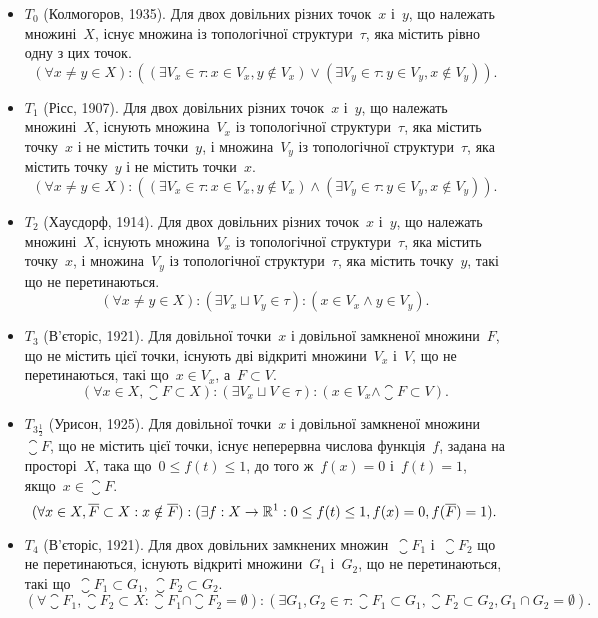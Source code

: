 \begin{itemize}
    \item $T_0$ (Колмогоров, 1935). Для двох довільних різних точок~$x$ і~$y$, що належать множині~$X$, існує множина із топологічної структури~$\tau$, яка містить рівно одну з цих точок.
    \[ (\forall x \ne y \in X): ((\exists V_x \in \tau: x \in V_x, y \notin V_x) \lor (\exists V_y \in \tau: y \in V_y, x \notin V_y)). \]

    \item $T_1$ (Рісс, 1907). Для двох довільних різних точок~$x$ і~$y$, що належать множині~$X$, існують множина~$V_x$ із топологічної структури~$\tau$, яка містить точку~$x$ і не містить точки~$y$, і множина~$V_y$ із топологічної структури~$\tau$, яка містить точку~$y$ і не містить точки~$x$.
    \[ (\forall x \ne y \in X): ((\exists V_x \in \tau: x \in V_x, y \notin V_x) \land (\exists V_y \in \tau: y \in V_y, x \notin V_y)). \]

    \item $T_2$ (Хаусдорф, 1914). Для двох довільних різних точок~$x$ і~$y$, що належать множині~$X$, існують множина~$V_x$ із топологічної структури~$\tau$, яка містить точку~$x$, і множина~$V_y$ із топологічної структури~$\tau$, яка містить точку~$y$, такі що не перетинаються.
    \[ (\forall x \ne y \in X): (\exists V_x \sqcup V_y \in \tau): (x \in V_x \land y \in V_y). \]

    \item $T_3$ (В'єторіс, 1921). Для довільної точки~$x$ і довільної замкненої множини~$F$, що не містить цієї точки, існують дві відкриті множини~$V_x$ і~$V$, що не перетинаються, такі що~$x \in V_x$, а~$F \subset V$.
    \[ (\forall x \in X, \closure{F} \subset X): (\exists V_x \sqcup V \in \tau): (x \in V_x \land \closure{F} \subset V). \]

    \item $T_{3\frac{1}{2}}$ (Урисон, 1925). Для довільної точки~$x$ і довільної замкненої множини~$\closure{F}$, що не містить цієї точки, існує неперервна числова функція~$f$, задана на просторі~$X$, така що~$0 \le f(t) \le 1$, до того ж~$f(x) = 0$ і~$f(t) = 1$, якщо~$x \in \closure{F}$.
    \begin{equation*}
        (\forall x \in X, \overline{F} \subset X: x \notin \overline{F}):
        (\exists f: X \to \mathbb{R}^1: 0 \le f(t) \le 1, f(x) = 0, f(\overline{F}) = 1).
    \end{equation*}

    \item $T_4$ (В'єторіс, 1921). Для двох довільних замкнених множин~$\closure{F_1}$ і~$\closure{F_2}$ що не перетинаються, існують відкриті множини~$G_1$ і~$G_2$, що не перетинаються, такі що~$\closure{F_1} \subset G_1$, $\closure{F_2} \subset G_2$.
    \begin{equation*}
        (\forall \closure{F_1}, \closure{F_2} \subset X: \closure{F_1} \cap \closure{F_2} = \emptyset):
        (\exists G_1, G_2 \in \tau: \closure{F_1} \subset G_1, \closure{F_2} \subset G_2, G_1 \cap G_2 = \emptyset).
    \end{equation*}
\end{itemize}

